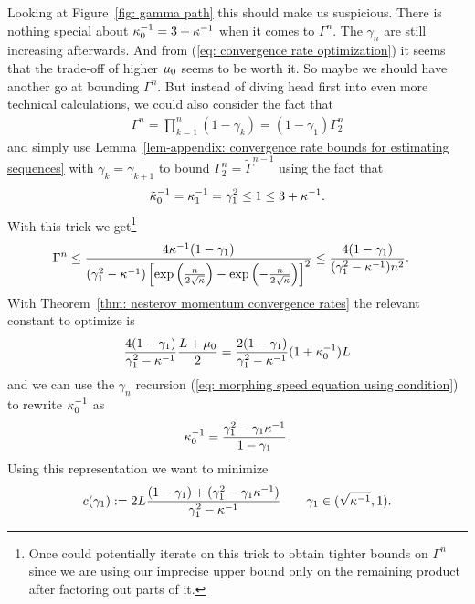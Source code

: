 Looking at Figure~\ref{fig: gamma path} this should make us suspicious. There
is nothing special about \(\kappa_0^{-1}=3+\kappa^{-1}\) when it
comes to \(\Gamma^n\). The \(\gamma_n\) are still increasing afterwards. And
from (\ref{eq: convergence rate optimization}) it seems that the trade-off of
higher \(\mu_0\) seems to be worth it. So maybe we should have another go
at bounding \(\Gamma^n\). But instead of diving head first into even more
technical calculations, we could also consider the fact that
\begin{align*}
	\Gamma^n
	= \prod_{k=1}^n (1-\gamma_k)
	= (1-\gamma_1)\Gamma_2^n 
\end{align*}
and simply use Lemma~\ref{lem-appendix: convergence rate bounds for estimating sequences}
with \(\tilde{\gamma}_k = \gamma_{k+1}\) to bound \(\Gamma_2^n=\tilde{\Gamma}^{n-1}\)
using the fact that
\begin{align*}
	\tilde{\kappa}_0^{-1} = \kappa_1^{-1} = \gamma_1^2 \le 1 \le 3+\kappa^{-1}.
\end{align*}
With this trick we get\footnote{Once could potentially iterate on this trick to obtain
tighter bounds on \(\Gamma^n\) since we are using our imprecise upper bound only on the
remaining product after factoring out parts of it.}
\begin{align*}
	\Gamma^n
	&\le \frac{4\kappa^{-1}(1-\gamma_1)}{(\gamma_1^2-\kappa^{-1})\left[
		\exp\left(\frac{n}{2\sqrt{\kappa}}\right)
		-\exp\left(-\frac{n}{2\sqrt{\kappa}}\right)
	\right]^2}
	\le \frac{4(1-\gamma_1)}{(\gamma_1^2-\kappa^{-1})n^2}.
\end{align*}
With Theorem~\ref{thm: nesterov momentum convergence rates} the relevant
constant to optimize is
\begin{align*}
	\frac{4(1-\gamma_1)}{\gamma_1^2-\kappa^{-1}}\frac{L+\mu_0}{2}
	= \frac{2(1-\gamma_1)}{\gamma_1^2-\kappa^{-1}}(1+\kappa_0^{-1})L
\end{align*}
and we can use the \(\gamma_n\) recursion (\ref{eq: morphing speed equation using condition})
to rewrite \(\kappa_0^{-1}\) as
\begin{align*}
	\kappa_0^{-1} = \frac{\gamma_1^2 - \gamma_1\kappa^{-1}}{1-\gamma_1}.
\end{align*}
Using this representation we want to minimize
\begin{align*}
	c(\gamma_1)
	:=2L\frac{(1-\gamma_1) + (\gamma_1^2 - \gamma_1\kappa^{-1})}{\gamma_1^2 -\kappa^{-1}}
	\qquad \gamma_1\in(\sqrt{\kappa^{-1}}, 1).
\end{align*}
